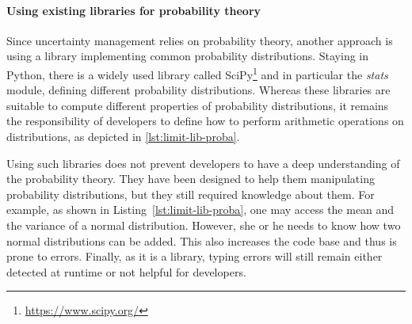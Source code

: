 \paragraph{Using existing libraries for probability theory}
%
Since uncertainty management relies on probability theory, another approach is using a library implementing common probability distributions.
Staying in Python, there is a widely used library called SciPy\footnote{\url{https://www.scipy.org/}} and in particular the \textit{stats} module, defining different probability distributions.
Whereas these libraries are suitable to compute different properties of probability distributions, it remains the responsibility of developers to define how to perform arithmetic operations on distributions, as depicted in \autoref{lst:limit-lib-proba}.

Using such libraries does not prevent developers to have a deep understanding of the probability theory.
They have been designed to help them manipulating probability distributions, but they still required knowledge about them.
For example, as shown in Listing~\ref{lst:limit-lib-proba}, one may access the mean and the variance of a normal distribution.
However, she or he needs to know how two normal distributions can be added.
This also increases the code base and thus is prone to errors.
Finally, as it is a library, typing errors will still remain either detected at runtime or not helpful for developers.


